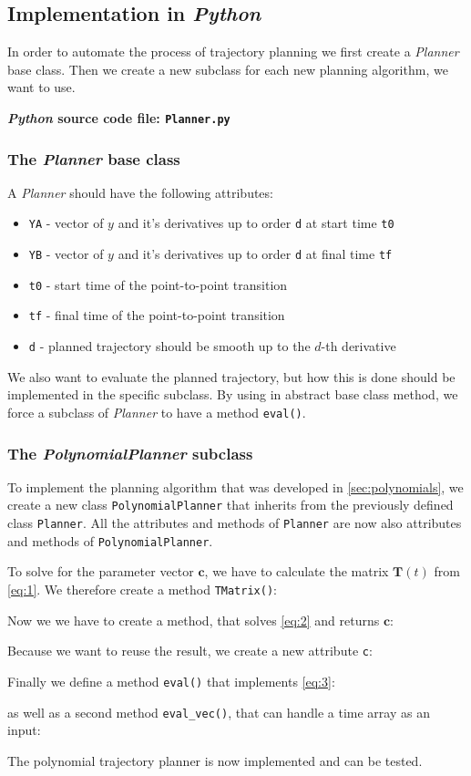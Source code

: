\documentclass[a4paper,11pt,headings=standardclasses,parskip=half]{scrartcl}
\newcommand{\listcode}[3]{}
\newcommand{\listcodeplanner}[2]{\listcode{#1}{#2}{../sim/Planner.py}}
\newcommand{\py}{\emph{Python}\xspace}
\begin{document}
\subsection{Implementation in \py}
In order to automate the process of trajectory planning we first create a \emph{Planner} base class. Then we create a new subclass for each new planning algorithm, we want to use.

\textbf{\py source code file: \texttt{Planner.py}}
\subsubsection{The \emph{Planner} base class}
A \emph{Planner} should have the following attributes:
\begin{itemize}
	\item[] \texttt{YA} - vector of $y$ and it's derivatives up to order \texttt{d} at start time \texttt{t0}
	\item[] \texttt{YB} - vector of $y$ and it's derivatives up to order \texttt{d} at final time \texttt{tf}
	\item[] \texttt{t0} - start time of the point-to-point transition
	\item[] \texttt{tf} - final time of the point-to-point transition
	\item[] \texttt{d} - planned trajectory should be smooth up to the $d$-th derivative
\end{itemize}
We also want to evaluate the planned trajectory, but how this is done should be implemented in the specific subclass. By using in abstract base class method, we force a subclass of \emph{Planner} to have a method \texttt{eval()}.
\listcodeplanner{2}{27}
\subsubsection{The \emph{PolynomialPlanner} subclass}
\label{sec:polynomialplanner}
To implement the planning algorithm that was developed in \autoref{sec:polynomials}, we create a new class \texttt{PolynomialPlanner} that inherits from the previously defined class \texttt{Planner}. All the attributes and methods of \texttt{Planner} are now also attributes and methods of \texttt{PolynomialPlanner}.
\listcodeplanner{28}{33}
To solve for the parameter vector $\mathbf{c}$, we have to calculate the matrix $\mathbf{T}(t)$ from \eqref{eq:1}. We therefore create a method \texttt{TMatrix()}:
\listcodeplanner{73}{94}
Now we we have to create a method, that solves \eqref{eq:2} and returns $\mathbf{c}$:
\listcodeplanner{97}{116}
Because we want to reuse the result, we create a new attribute \texttt{c}:
\listcodeplanner{35}{79}
Finally we define a method \texttt{eval()} that implements \eqref{eq:3}:
\listcodeplanner{39}{54}
as well as a second method \texttt{eval\_vec()}, that can handle a time array as an input:
\listcodeplanner{57}{70}
The polynomial trajectory planner is now implemented and can be tested.
\end{document}
